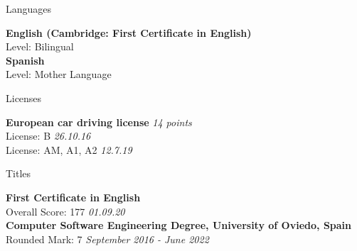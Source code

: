 \documentclass{resume} %
\begin{document}

\begin{rSection}{Languages}

{\bf English (Cambridge: First Certificate in English)} \\ 
Level: Bilingual \\
{\bf Spanish} \\
Level: Mother Language \\

\end{rSection}


\begin{rSection}{Licenses}

{\bf European car driving license} \hfill {\em 14 points}\\ 
License: B \hfill {\em 26.10.16} \\
License: AM, A1, A2 \hfill {\em 12.7.19} \\

\end{rSection}


\begin{rSection}{Titles}

{\bf First Certificate in English} \\ 
Overall Score: 177 \hfill {\em 01.09.20} \\

{\bf Computer Software Engineering Degree, University of Oviedo, Spain} \\
Rounded Mark: 7 \hfill {\em September 2016 - June 2022} \\ 

\end{rSection}

\end{document}

